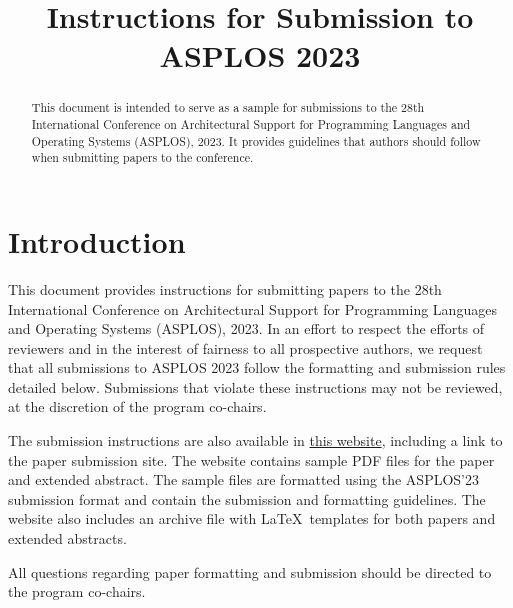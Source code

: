 \documentclass[pageno]{jpaper}
\begin{document}
\title{
Instructions for Submission to ASPLOS 2023}

\date{}
\maketitle

\thispagestyle{empty}

\begin{abstract}

This document is intended to serve as a sample for submissions to the
28th International Conference on Architectural Support for Programming
Languages and Operating Systems (ASPLOS), 2023.  It provides
guidelines that authors should follow when submitting papers to the
conference. 

\end{abstract}

\section{Introduction}

This document provides instructions for submitting papers to the 28th
International Conference on Architectural Support for Programming
Languages and Operating Systems (ASPLOS), 2023.  In an effort to
respect the efforts of reviewers and in the interest of fairness to
all prospective authors, we request that all submissions to ASPLOS
2023 follow the formatting and submission rules detailed below.
Submissions that violate these instructions may not be reviewed, at the
discretion of the program co-chairs.

The submission instructions are also available in
\href{https://asplos-conference.org/submissions/}{this website},
including a link to the paper submission site. The website contains
sample PDF files for the paper
and
extended abstract. The
sample files are formatted using the ASPLOS'23 submission format and
contain the submission and formatting guidelines. The website also
includes an archive file
with \LaTeX~templates for both papers and extended abstracts.

All questions regarding paper formatting and submission should be directed
to the program co-chairs.
\end{document}
